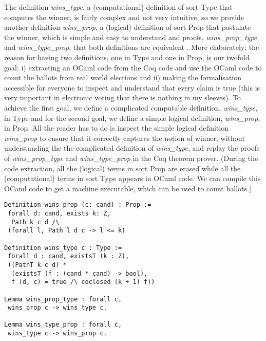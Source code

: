 \documentclass[compsoc,conference,a4paper,10pt,times]{IEEEtran}
\begin{document}
\noindent
The definition \textit{wins\_type},  a (computational) definition of sort Type that computes the winner,  is fairly complex 
and not very intuitive, so we provide another definition \textit{wins\_prop}, 
a (logical) definition of sort Prop that postulate the winner, which is simple and easy to 
understand and 
proofs, \textit{wins\_prop\_type} and \textit{wins\_type\_prop}, 
that both definitions are equivalent  \cite{Pattinson:2017:SVE}.
More elaborately: the reason 
for having two definitions, one in Type and one in Prop, 
is our twofold goal: 
i) extracting an OCaml 
code from the Coq code and use the OCaml code 
to count the ballots from real world elections and ii)
making the formalisation accessible for everyone 
to inspect and understand that every claim 
is true (this is very important in electronic voting that 
there is nothing in my sleeves). To achieve the 
first goal, we define a complicated computable definition, 
\textit{wins\_type}, in Type 
and for the second goal, we define a simple logical definition,
\textit{wins\_prop}, in Prop. 
All the reader has to do is inspect the simple logical definition 
\textit{wins\_prop} to ensure that it correctly captures the notion 
of winner,  without understanding the the complicated
definition of \textit{wins\_type}, and replay the proofs of 
\textit{wins\_prop\_type} and \textit{wins\_type\_prop} in the Coq theorem prover. 
(During the code extraction, all the (logical) terms in sort Prop are erased while 
all the (computational) terms 
in sort Type appears in OCaml code. We can compile this OCaml code to get 
a machine executable, which can be used to count ballots.) 

	  
\begin{verbatim}
Definition wins_prop (c: cand) : Prop := 
 forall d: cand, exists k: Z,
  Path k c d /\ 
 (forall l, Path l d c -> l <= k)
	 
Definition wins_type c : Type :=
 forall d : cand, existsT (k : Z),
 ((PathT k c d) *
  (existsT (f : (cand * cand) -> bool), 
  f (d, c) = true /\ coclosed (k + 1) f))
  
Lemma wins_prop_type : forall c, 
 wins_prop c -> wins_type c.
   
Lemma wins_type_prop : forall c, 
 wins_type c -> wins_prop c.    
\end{verbatim}
\end{document}
